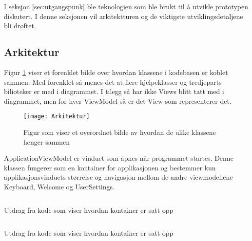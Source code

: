 { 
I seksjon \ref{sec:utgangspunk} ble teknologien som ble brukt til å utvikle prototypen diskutert. I denne seksjonen vil arkitektturen og de viktigste utviklingsdetaljene  bli drøftet.  
 
 
\subsection{Arkitektur} 
 
 
Figur \ref{fig:arkitektur} viser et forenklet bilde over hvordan klassene i kodebasen er koblet sammen. Med forenklet så menes det at flere hjelpeklasser og tredjeparts bilioteker er med i diagrammet. I tilegg så har ikke Views blitt tatt med i diagrammet, men for hver ViewModel så er det View som representerer det.  
 

\begin{figure}[ht] 
\centering 
\texttt{[image: Arkitektur]} 
\caption{Figur som viser et overordnet bilde av hvordan de ulike klassene henger sammen} 
\label{fig:arkitektur} 
\end{figure} 
 

 
ApplicationViewModel er vinduet som åpnes når programmet startes. Denne klassen fungerer som en kontainer for applikasjonen og bestemmer kun applikasjonsvinduets størrelse og navigasjon mellom de andre viewmodellene Keyboard, Welcome og UserSettings.  
 
 

\begin{listing}[ht] 
\inputminted[fontsize=\footnotesize, frame=lines,framesep=2mm,baselinestretch=1.2,bgcolor=lightgray,linenos]{xml}{Code/ApplicationContainer.xml} 
\caption{Utdrag fra kode som viser hvordan kontainer er satt opp} 
\label{listing:Kontainer} 
\end{listing} 
 
 
\begin{listing}[ht] 
\inputminted[fontsize=\footnotesize, frame=lines,framesep=2mm,baselinestretch=1.2,bgcolor=lightgray,linenos]{csharp}{Code/CurrentApplicationView.cs} 
\caption{Utdrag fra kode som viser hvordan kontainer er satt opp} 
\label{listing:CurrentAppView} 
\end{listing} 
 
 
 
}
